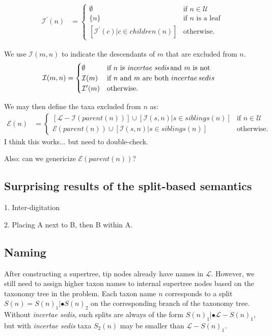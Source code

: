 \documentclass[english]{article}
\begin{document}
\begin{align*} \mathcal{I^{\prime}}(n) & =\begin{cases} \emptyset &
\text{if }n\in\mathcal{U}\\ \{n\} & \text{if }n\text{ is a leaf}\\{}
[\mathcal{I}^{\prime}(c)|c\in children(n)] & \text{otherwise.}
\end{cases} \end{align*}

We use $\mathcal{I}(m,n)$ to indicate the descendants of $m$ that are
excluded from $n$.
\begin{align*} \mathcal{I}(m,n) & =\begin{cases}
\emptyset & \text{if }n\text{ is \emph{incertae sedis}\,and }m\text{
is not}\\ \mathcal{I}(m) & \text{if }n\text{ and }m\text{ are both
}incertae\,sedis\\ \mathcal{I}^{\prime}(m) & \text{otherwise.}
\end{cases} \end{align*}

We may then define the taxa excluded from $n$ as:
\begin{align*}
\mathcal{E}(n) & =\begin{cases}
\left[\mathcal{L}-\mathcal{I}(parent(n))\right]\cup[\mathcal{I}(s,n)|s\in siblings(n)] & \text{if }n\in\mathcal{U}\\
\mathcal{E}(parent(n))\cup[\mathcal{I}(s,n)|s\in siblings(n)] & \text{otherwise.}
\end{cases}
\end{align*}
I think this works... but need to double-check.

Also: can we genericize $\mathcal{E}(parent(n))$?

\subsection{Surprising results of the split-based semantics}

1. Inter-digitation

2. Placing A next to B, then B within A.

\subsection{Naming }

After constructing a supertree, tip nodes already have names in \emph{$\mathcal{L}$}.
However, we still need to assign higher taxon names to internal supertree nodes
based on the taxonomy tree in the problem. Each taxon name $n$ corresponds to a
split $S(n)=S(n)_{1}|\bullet S(n)_{2}$ on the corresponding branch of the taxonomy tree. Without
\emph{incertae sedis}, such splits are always of the form $S(n)_{1}|\bullet\mathcal{L}-S(n)_{1}$, but
with \emph{incertae sedis} taxa $S_{2}(n)$ may be smaller than $\mathcal{L}-S(n)_{1}$.
\end{document}
